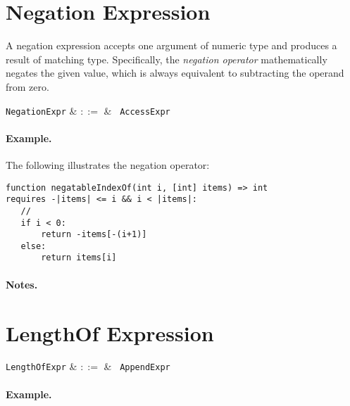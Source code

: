 
\section{Negation Expression}
\label{c_expr_negation}

A negation expression accepts one argument of numeric type and produces a result of matching type.  Specifically, the {\em negation operator} mathematically negates the given value, which is always equivalent to subtracting the operand from zero.

\begin{syntax}
\verb+NegationExpr+ & $::=$ & \token{-}\ \verb+AccessExpr+\\
\end{syntax}

\paragraph{Example.} The following illustrates the negation operator:

\begin{lstlisting}
function negatableIndexOf(int i, [int] items) => int
requires -|items| <= i && i < |items|:
   //
   if i < 0:
       return -items[-(i+1)]
   else:
       return items[i]
\end{lstlisting}

\paragraph{Notes.}


\section{LengthOf Expression}
\label{c_expr_lengthof}

\begin{syntax}
\verb+LengthOfExpr+ & $::=$ & \token{|}\ \verb+AppendExpr+\ \token{|}\\
\end{syntax}

\paragraph{Example.}

